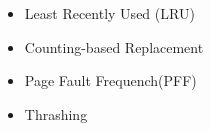 \documentclass[12pt]{article}
\begin{document}
\begin{itemize}
    \item Least Recently Used (LRU)
    \item Counting-based Replacement
    \item Page Fault Frequench(PFF)
    \item Thrashing
\end{itemize}
\end{document}
